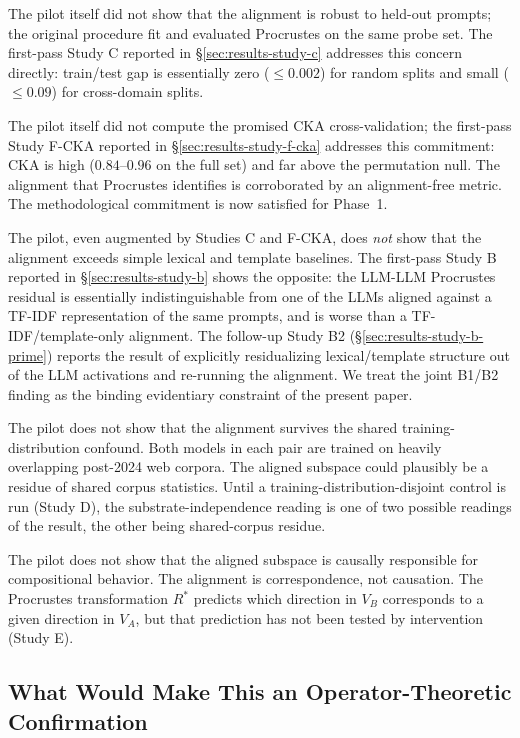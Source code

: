 The pilot itself did not show that the alignment is robust to
held-out prompts; the original procedure fit and evaluated Procrustes
on the same probe set. The first-pass Study C reported in
\S\ref{sec:results-study-c} addresses this concern directly:
train/test gap is essentially zero ($\leq 0.002$) for random splits
and small ($\leq 0.09$) for cross-domain splits.

The pilot itself did not compute the promised CKA cross-validation;
the first-pass Study F-CKA reported in \S\ref{sec:results-study-f-cka}
addresses this commitment: CKA is high ($0.84$--$0.96$ on the full
set) and far above the permutation null. The alignment that Procrustes
identifies is corroborated by an alignment-free metric. The
methodological commitment is now satisfied for Phase~1.

The pilot, even augmented by Studies C and F-CKA, does \emph{not} show
that the alignment exceeds simple lexical and template baselines. The
first-pass Study B reported in \S\ref{sec:results-study-b} shows the
opposite: the LLM-LLM Procrustes residual is essentially indistinguishable
from one of the LLMs aligned against a TF-IDF representation of the
same prompts, and is worse than a TF-IDF/template-only alignment. The
follow-up Study B2 (\S\ref{sec:results-study-b-prime}) reports the
result of explicitly residualizing lexical/template structure out of
the LLM activations and re-running the alignment. We treat the joint
B1/B2 finding as the binding evidentiary constraint of the present
paper.

The pilot does not show that the alignment survives the shared
training-distribution confound. Both models in each pair are trained
on heavily overlapping post-2024 web corpora. The aligned subspace
could plausibly be a residue of shared corpus statistics. Until a
training-distribution-disjoint control is run (Study D), the
substrate-independence reading is one of two possible readings of the
result, the other being shared-corpus residue.

The pilot does not show that the aligned subspace is causally
responsible for compositional behavior. The alignment is correspondence,
not causation. The Procrustes transformation $R^*$ predicts which
direction in $V_B$ corresponds to a given direction in $V_A$, but
that prediction has not been tested by intervention (Study E).

\subsection{What Would Make This an Operator-Theoretic Confirmation}


